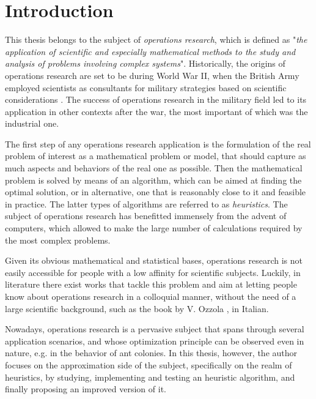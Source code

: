 \documentclass[a4paper,12pt,twoside]{scrbook}
\begin{document}
\tableofcontents

\pagestyle{headings}

\mainmatter

\chapter{Introduction}
This thesis belongs to the subject of \textit{operations research}, which is defined as "\textit{the application of scientific and especially mathematical methods to the study and analysis of problems involving complex systems}". Historically, the origins of operations research are set to be during World War II, when the British Army employed scientists as consultants for military strategies based on scientific considerations \cite{ozzola2007}. The success of operations research in the military field led to its application in other contexts after the war, the most important of which was the industrial one. \par 
The first step of any operations research application is the formulation of the real problem of interest as a mathematical problem or model, that should capture as much aspects and behaviors of the real one as possible. Then the mathematical problem is solved by means of an algorithm, which can be aimed at finding the optimal solution, or in alternative, one that is reasonably close to it and feasible in practice. The latter types of algorithms are referred to as \textit{heuristics}. The subject of operations research has benefitted immensely from the advent of computers, which allowed to make the large number of calculations required by the most complex problems. \par 
Given its obvious mathematical and statistical bases, operations research is not easily accessible for people with a low affinity for scientific subjects. Luckily, in literature there exist works that tackle this problem and aim at letting people know about operations research in a colloquial manner, without the need of a large scientific background, such as the book by V. Ozzola \cite{ozzola2007}, in Italian. \par 
Nowadays, operations research is a pervasive subject that spans through several application scenarios, and whose optimization principle can be observed even in nature, e.g. in the behavior of ant colonies. In this thesis, however, the author focuses on the approximation side of the subject, specifically on the realm of heuristics, by studying, implementing and testing an heuristic algorithm, and finally proposing an improved version of it.
\end{document}
